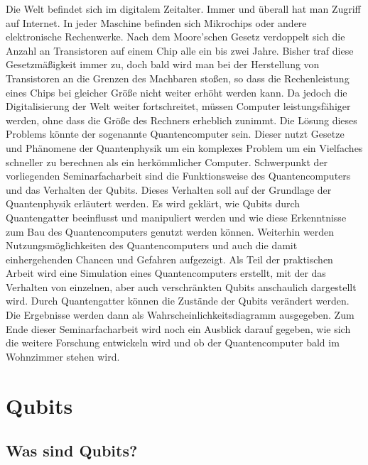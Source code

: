 \documentclass[12pt]{report}
\begin{document}
Die Welt befindet sich im digitalem Zeitalter. Immer und überall hat man Zugriff auf Internet. In jeder Maschine befinden sich Mikrochips oder andere elektronische Rechenwerke. Nach dem Moore'schen Gesetz verdoppelt sich die Anzahl an Transistoren auf einem Chip alle ein bis zwei Jahre. Bisher traf diese Gesetzmäßigkeit immer zu, doch bald wird man bei der Herstellung von Transistoren an die Grenzen des Machbaren stoßen, so dass die Rechenleistung eines Chips bei gleicher Größe nicht weiter erhöht werden kann.
Da jedoch die Digitalisierung der Welt weiter fortschreitet, müssen Computer leistungsfähiger werden, ohne dass die Größe des Rechners erheblich zunimmt. Die Lösung dieses Problems könnte der sogenannte Quantencomputer sein. Dieser nutzt Gesetze und Phänomene der Quantenphysik um ein komplexes Problem um ein Vielfaches schneller zu berechnen als ein herkömmlicher Computer. \newline
Schwerpunkt der vorliegenden Seminarfacharbeit sind die Funktionsweise des Quantencomputers und das Verhalten der Qubits. Dieses Verhalten soll auf der Grundlage der Quantenphysik erläutert werden. Es wird geklärt, wie Qubits durch Quantengatter beeinflusst und manipuliert werden und wie diese Erkenntnisse zum Bau des Quantencomputers genutzt werden können. Weiterhin werden Nutzungsmöglichkeiten des Quantencomputers und auch die damit einhergehenden Chancen und Gefahren aufgezeigt. \newline
Als Teil der praktischen Arbeit wird eine Simulation eines Quantencomputers erstellt, mit der das Verhalten von einzelnen, aber auch verschränkten Qubits anschaulich dargestellt wird. Durch Quantengatter können die Zustände der Qubits verändert werden. Die Ergebnisse werden dann als Wahrscheinlichkeitsdiagramm ausgegeben.
Zum Ende dieser Seminarfacharbeit wird noch ein Ausblick darauf gegeben, wie sich die weitere Forschung entwickeln wird und ob der Quantencomputer bald im Wohnzimmer stehen wird.

\chapter{Qubits}
\section{Was sind Qubits?}
\end{document}
